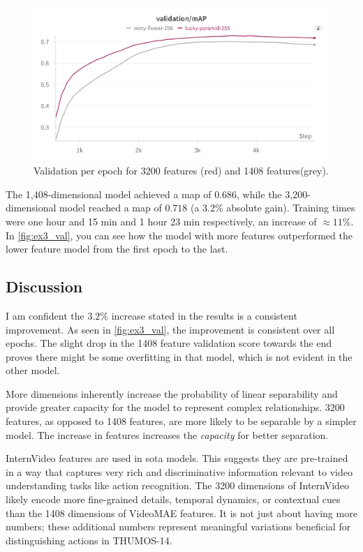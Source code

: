 \begin{figure}
    \centering
    \includegraphics[width=0.75\linewidth]{figures/1408_3200_val.png}
    \caption{Validation per epoch for 3200 features (red) and 1408 features(grey). }
    \label{fig:ex3_val}
\end{figure}
The 1,408-dimensional model achieved a  \acrshort{map} of \(0.686\), while the 3,200-dimensional model reached a \acrshort{map} of \(0.718\) (a 3.2\% absolute gain). Training times were one hour and 15 min and 1 hour 23 min respectively, an increase of \(\approx11\%\). In \autoref{fig:ex3_val}, you can see how the model with more features outperformed the lower feature model from the first epoch to the last. 


\subsection{Discussion}
\label{ssec:ex3_discussion}


I am confident the $3.2\%$ increase stated in the results is a consistent improvement. As seen in \autoref{fig:ex3_val}, the improvement is consistent over all epochs. The slight drop in the 1408 feature validation score towards the end proves there might be some overfitting in that model, which is not evident in the other model. 


More dimensions inherently increase the probability of linear separability and provide greater capacity for the model to represent complex relationships. 3200 features, as opposed to 1408 features, are more likely to be separable by a simpler model. The increase in features increases the \textit{capacity} for better separation. 


InternVideo features are used in \acrshort{sota} models. This suggests they are pre-trained in a way that captures very rich and discriminative information relevant to video understanding tasks like action recognition. The 3200 dimensions of InternVideo likely encode more fine-grained details, temporal dynamics, or contextual cues than the 1408 dimensions of VideoMAE features. It is not just about having more numbers; these additional numbers represent meaningful variations beneficial for distinguishing actions in THUMOS-14.



